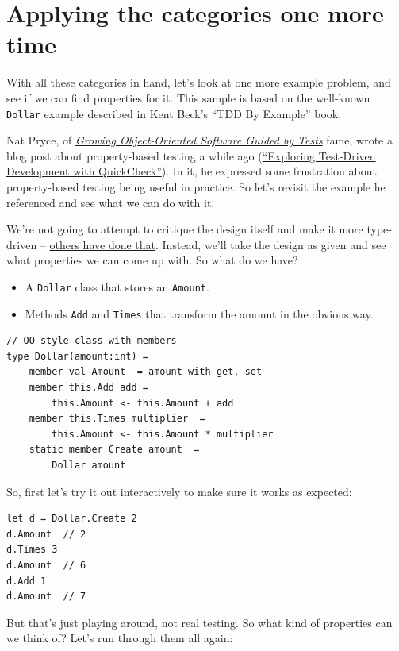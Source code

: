\section{Applying the categories one more
time}
\label{applying-the-categories-one-more-time}

With all these categories in hand, let's look at one more example
problem, and see if we can find properties for it.
This sample is based on the well-known \texttt{Dollar} example described
in Kent Beck's ``TDD By Example'' book.

Nat Pryce, of
\href{http://www.growing-object-oriented-software.com/}{\emph{Growing
Object-Oriented Software Guided by Tests}} fame, wrote a blog post about
property-based testing a while ago
(\href{http://www.natpryce.com/articles/000795.html}{``Exploring
Test-Driven Development with QuickCheck''}).
In it, he expressed some frustration about property-based testing being
useful in practice. So let's revisit the example he referenced and see
what we can do with it.

We're not going to attempt to critique the design itself and make it
more type-driven --
\href{http://spin.atomicobject.com/2014/12/10/typed-language-tdd-part2/}{others
have done that}. Instead, we'll take the design as given and see what
properties we can come up with.
So what do we have?

\begin{itemize}
\item
  A \texttt{Dollar} class that stores an \texttt{Amount}.
\item
  Methods \texttt{Add} and \texttt{Times} that transform the amount in
  the obvious way.
\end{itemize}
\begin{verbatim}
// OO style class with members
type Dollar(amount:int) =
	member val Amount  = amount with get, set
	member this.Add add = 
		this.Amount <- this.Amount + add
	member this.Times multiplier  = 
		this.Amount <- this.Amount * multiplier  
	static member Create amount  = 
		Dollar amount  
\end{verbatim}
So, first let's try it out interactively to make sure it works as
expected:

\begin{verbatim}
let d = Dollar.Create 2
d.Amount  // 2
d.Times 3 
d.Amount  // 6
d.Add 1
d.Amount  // 7
\end{verbatim}
But that's just playing around, not real testing. So what kind of
properties can we think of?
Let's run through them all again:

